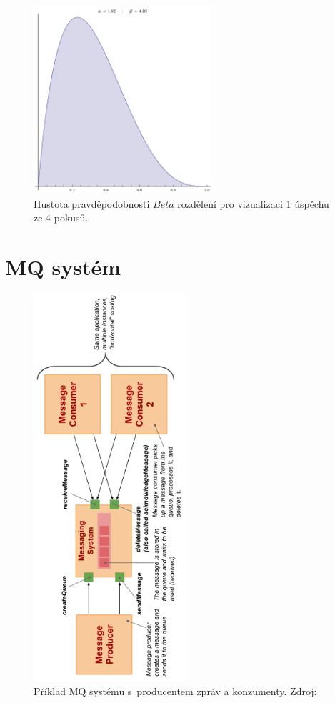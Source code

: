 \documentclass[thesis=M,czech]{FITthesis}[2014/05/07]
\begin{document}
\begin{figure}\centering
	\includegraphics[width=0.6\textwidth]{obr/beta2.png}
 	\caption[Hustota pravděpodobnosti $Beta$ rozdělení pro vizualizaci 1 úspěchu ze 4 pokusů.]{Hustota pravděpodobnosti $Beta$ rozdělení pro vizualizaci 1 úspěchu ze 4 pokusů.}\label{fig:beta2}
\end{figure}	

\section{MQ systém}

\begin{figure}\centering
	\includegraphics[width=0.5\textwidth]{obr/vitvar_mq.png}
 	\caption[Příklad MQ systému s~producentem zpráv a konzumenty]{Příklad MQ systému s~producentem zpráv a konzumenty. Zdroj: \cite{vitvarMq}}\label{fig:vitvarMq}
\end{figure}	
\end{document}
